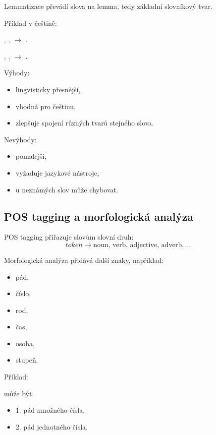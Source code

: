 Lemmatizace převádí slova na lemma, tedy základní slovníkový tvar.

Příklad v češtině:
\begin{center}
, ,  $\rightarrow$ .
\end{center}

\begin{center}
, ,  $\rightarrow$ .
\end{center}

Výhody:
\begin{itemize}
    \item lingvisticky přesnější,
    \item vhodná pro češtinu,
    \item zlepšuje spojení různých tvarů stejného slova.
\end{itemize}

Nevýhody:
\begin{itemize}
    \item pomalejší,
    \item vyžaduje jazykové nástroje,
    \item u neznámých slov může chybovat.
\end{itemize}

\subsection{POS tagging a morfologická analýza}

POS tagging přiřazuje slovům slovní druh:
\[
token
\rightarrow
\text{noun, verb, adjective, adverb, ...}
\]

Morfologická analýza přidává další znaky, například:
\begin{itemize}
    \item pád,
    \item číslo,
    \item rod,
    \item čas,
    \item osoba,
    \item stupeň.
\end{itemize}

Příklad:
\begin{center}
\end{center}
může být:
\begin{itemize}
    \item 1. pád množného čísla,
    \item 2. pád jednotného čísla.
\end{itemize}

